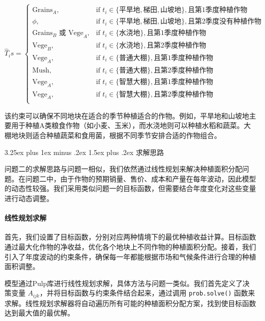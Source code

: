 \documentclass[12pt,a4paper]{nmmcm}
\makeatletter
\renewcommand\subsection{\@startsection{subsection}{2}{0pt}%
    {3.25ex plus 1ex minus .2ex}%
    {1.5ex plus .2ex}%
    {\normalfont\Large\bfseries}}
\makeatother
\begin{document}
\[
\hat{T}_is =
\begin{cases}
    \text{Grains}_A, & \text{if } t_i \in \{\text{平旱地}, \text{梯田}, \text{山坡地}\}, \text{且第} 1 \text{季度种植作物} \\
    \phi, & \text{if } t_i \in \{\text{平旱地}, \text{梯田}, \text{山坡地}\}, \text{且第} 2 \text{季度没有种植作物} \\
    \text{Grains}_B \text{ 或 } \text{Vege}_A, & \text{if } t_i \in \{\text{水浇地}\}, \text{且第} 1 \text{季度种植作物} \\
    \text{Vege}_B, & \text{if } t_i \in \{\text{水浇地}\}, \text{且第} 2 \text{季度种植作物} \\
    \text{Vege}_A, & \text{if } t_i \in \{\text{普通大棚}\}, \text{且第} 1 \text{季度种植作物} \\
    \text{Mush}, & \text{if } t_i \in \{\text{普通大棚}\}, \text{且第} 2 \text{季度种植作物} \\
    \text{Vege}_A, & \text{if } t_i \in \{\text{智慧大棚}\}, \text{且第} 1 \text{季度种植作物} \\
    \text{Vege}_A, & \text{if } t_i \in \{\text{智慧大棚}\}, \text{且第} 2 \text{季度种植作物} \\
\end{cases}
\]

该约束可以确保不同地块在适合的季节种植适合的作物。例如，平旱地和山坡地主要用于种植A类粮食作物（如小麦、玉米），而水浇地则可以种植水稻和蔬菜。大棚地块则适合种植蔬菜和食用菌，根据不同季节安排合适的作物组合。

\subsection{求解思路}

问题二的求解思路与问题一相似，我们依然通过线性规划来解决种植面积分配问题。在问题二中，由于作物的预期销量、售价、成本和产量在每年波动，因此模型的动态性较强。我们采用类似问题一的目标函数，但需要结合年度变化对这些变量进行动态调整。

\paragraph{线性规划求解}

首先，我们设置了目标函数，分别对应两种情境下的最优种植收益计算。目标函数通过最大化作物的净收益，优化各个地块上不同作物的种植面积分配。接着，我们引入了年度波动的约束条件，确保每一年都能根据市场和气候条件进行合理的种植面积调整。

模型通过Pulp库进行线性规划求解，具体方法与问题一类似。我们首先定义了决策变量 $A_{ijk}$，并将目标函数与约束条件结合起来，通过调用 \texttt{prob.solve()} 函数来求解。线性规划求解器将自动遍历所有可能的种植面积分配方案，找到使目标函数达到最大值的最优解。
\end{document}
